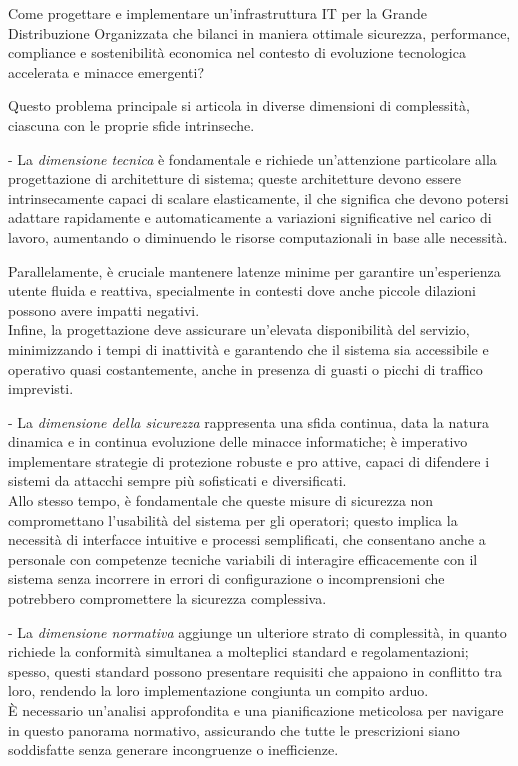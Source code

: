 \documentclass[12pt,a4paper,oneside]{book}
\numberwithin{figure}{chapter} %
\numberwithin{table}{chapter}  %
\begin{document}
Come progettare e implementare un'infrastruttura IT per la Grande
Distribuzione Organizzata che bilanci in maniera ottimale sicurezza,
performance, compliance e sostenibilità economica nel contesto di
evoluzione tecnologica accelerata e minacce emergenti?

Questo problema principale si articola in diverse dimensioni di
complessità, ciascuna con le proprie sfide intrinseche.

- La \emph{dimensione tecnica} è fondamentale e richiede un'attenzione
particolare alla progettazione di architetture di sistema; queste
architetture devono essere intrinsecamente capaci di scalare
elasticamente, il che significa che devono potersi adattare rapidamente
e automaticamente a variazioni significative nel carico di lavoro,
aumentando o diminuendo le risorse computazionali in base alle
necessità. 

Parallelamente, è cruciale mantenere latenze minime per garantire
un'esperienza utente fluida e reattiva, specialmente in contesti dove
anche piccole dilazioni possono avere impatti negativi.\\
Infine, la progettazione deve assicurare un'elevata disponibilità del
servizio, minimizzando i tempi di inattività e garantendo che il sistema
sia accessibile e operativo quasi costantemente, anche in presenza di
guasti o picchi di traffico imprevisti.

- La \emph{dimensione della sicurezza} rappresenta una sfida continua,
data la natura dinamica e in continua evoluzione delle minacce
informatiche; è imperativo implementare strategie di protezione robuste
e pro attive, capaci di difendere i sistemi da attacchi sempre più
sofisticati e diversificati.\\
Allo stesso tempo, è fondamentale che queste misure di sicurezza non
compromettano l'usabilità del sistema per gli operatori; questo implica
la necessità di interfacce intuitive e processi semplificati, che
consentano anche a personale con competenze tecniche variabili di
interagire efficacemente con il sistema senza incorrere in errori di
configurazione o incomprensioni che potrebbero compromettere la
sicurezza complessiva.

- La \emph{dimensione normativa} aggiunge un ulteriore strato di
complessità, in quanto richiede la conformità simultanea a molteplici
standard e regolamentazioni; spesso, questi standard possono presentare
requisiti che appaiono in conflitto tra loro, rendendo la loro
implementazione congiunta un compito arduo.\\
È necessario un'analisi approfondita e una pianificazione meticolosa per
navigare in questo panorama normativo, assicurando che tutte le
prescrizioni siano soddisfatte senza generare incongruenze o
inefficienze.
\end{document}
